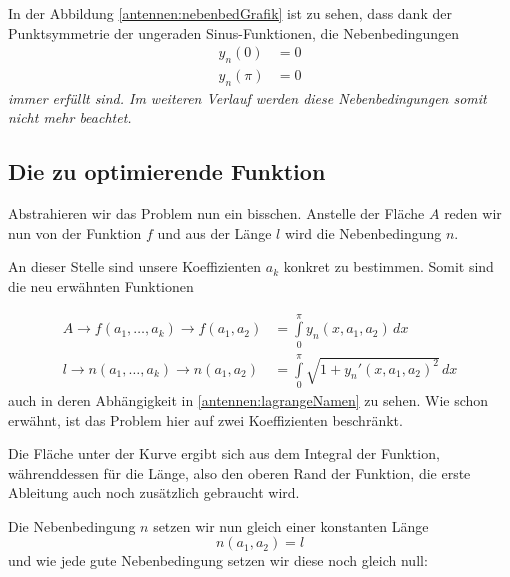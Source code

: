 In der Abbildung \ref{antennen:nebenbedGrafik} ist zu sehen, dass dank der Punktsymmetrie 
der ungeraden Sinus-Funktionen, die Nebenbedingungen
\begin{equation}
	\begin{aligned}
		y_n(0)
		&=
		0
		\\
		y_n(\pi)
		&=
		0
	\end{aligned}
\label{antennen:nebenbed3eck}
\end{equation}
\em immer erfüllt \em sind. Im weiteren Verlauf werden diese 
Nebenbedingungen somit nicht mehr beachtet.

\subsection{Die zu optimierende Funktion \label{antennen:optmFunktion}}


Abstrahieren wir das Problem nun ein bisschen. Anstelle der Fläche $A$ reden wir nun von 
der Funktion $f$ und aus der Länge $l$ wird die Nebenbedingung $n$. 

An dieser Stelle sind unsere Koeffizienten $a_k$ konkret zu bestimmen. 
Somit sind die neu erwähnten Funktionen 

\begin{equation}
\begin{aligned}
	A
	\rightarrow
	f(a_1,\ldots,a_k)
	\rightarrow
	f(a_1,a_2)
	&=
	\int\limits_{0}^{\pi} y_n(x,a_1,a_2)\, dx
	\\
	l
	\rightarrow
	n(a_1,\ldots,a_k)
	\rightarrow
	n(a_1,a_2)
	&=
	\int\limits_{0}^{\pi} \sqrt{1+y_n'(x, a_1, a_2)^2}\, dx
\end{aligned}
\label{antennen:lagrangeNamen}
\end{equation}
auch in deren Abhängigkeit in \eqref{antennen:lagrangeNamen} zu sehen. Wie schon erwähnt, 
ist das Problem hier auf zwei Koeffizienten beschränkt. 

Die Fläche unter der Kurve ergibt sich aus dem Integral der Funktion, 
währenddessen für die Länge, also den oberen Rand der Funktion, die 
erste Ableitung auch noch zusätzlich gebraucht wird.

Die Nebenbedingung $n$ setzen wir nun gleich einer konstanten Länge
\begin{equation}
n(a_1, a_2)
=
l
\label{antennen:constNebenbed}
\end{equation}
und wie jede gute Nebenbedingung setzen wir diese noch gleich null:

